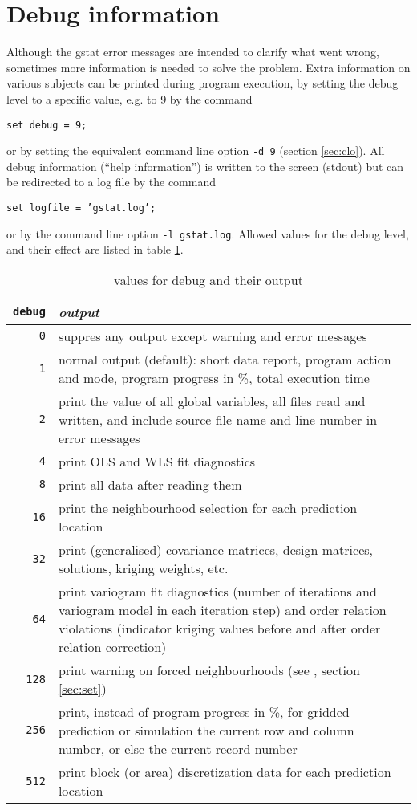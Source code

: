 \documentclass[a4paper,12pt]{book}
\newcommand{\code}[1]{\texttt{#1}}
\newcommand{\iskey}[1]{\htmlref{\code{{#1}}}{key:#1}}
\begin{document}
\section{Debug information}
\label{app:debug}

Although the gstat error messages are intended to clarify what went
wrong, sometimes more information is needed to solve the problem. Extra
information on various subjects can be printed during program execution,
by setting the debug level to a specific value, e.g. to 9 by the command

{\tt set debug = 9; }

\noindent
or by setting the equivalent command line option {\tt -d 9} (section
\ref{sec:clo}). All debug information (``help information'') is written
to the screen (stdout) but can be redirected to a log file by the command

{\tt set logfile = 'gstat.log'; }

\noindent
or by the command line option {\tt -l gstat.log}. Allowed values for
the debug level, and their effect are listed in table \ref{tab:debug}.

\begin{table}[ht]
\begin{tabular}{|r|p{12cm}|} \hline
{\tt debug} & {\em output} \\ \hline
{\tt 0} & suppres any output except warning and error messages \\
{\tt 1} & normal output (default): short data report, program
action and mode, program progress in \%, total execution time \\
{\tt 2} & print the value of all global variables, all files
read and written, and include source file name and line number
in error messages \\
{\tt 4} & print OLS and WLS fit diagnostics \\
{\tt 8} & print all data after reading them \\
{\tt 16} & print the neighbourhood selection for each prediction
location  \\
{\tt 32} & print (generalised) covariance matrices, design
matrices, solutions, kriging weights, etc. \\
{\tt 64} & print variogram fit diagnostics (number of iterations 
and variogram model in each iteration step) and order relation
violations (indicator kriging values before and after order relation
correction) \\
{\tt 128} & print warning on forced neighbourhoods (see \iskey{force}%
, section \ref{sec:set}) \\
{\tt 256} & print, instead of program progress in \%, for gridded
prediction or simulation the current row and column number, or else the
current record number \\
{\tt 512} & print block (or area) discretization data for each
prediction location \\ \hline
\end{tabular}
\label{tab:debug}
\caption{values for debug and their output}
\end{table} 
\end{document}
